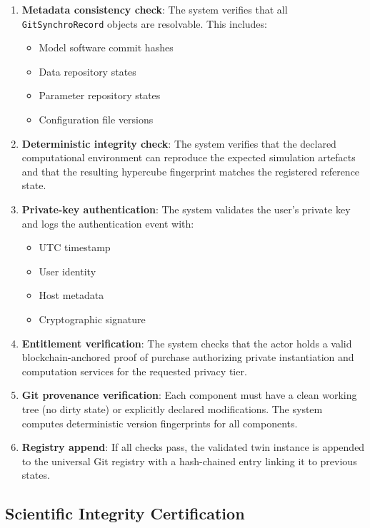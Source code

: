 \begin{enumerate}
\item \textbf{Metadata consistency check}: The system verifies that all \texttt{GitSynchroRecord} objects are resolvable. This includes:
\begin{itemize}
    \item Model software commit hashes
    \item Data repository states
    \item Parameter repository states
    \item Configuration file versions
\end{itemize}

\item \textbf{Deterministic integrity check}: The system verifies that the declared computational environment can reproduce the expected simulation artefacts and that the resulting hypercube fingerprint matches the registered reference state.

\item \textbf{Private-key authentication}: The system validates the user's private key and logs the authentication event with:
\begin{itemize}
    \item UTC timestamp
    \item User identity
    \item Host metadata
    \item Cryptographic signature
\end{itemize}

\item \textbf{Entitlement verification}: The system checks that the actor holds a valid blockchain-anchored proof of purchase authorizing private instantiation and computation services for the requested privacy tier.

\item \textbf{Git provenance verification}: Each component must have a clean working tree (no dirty state) or explicitly declared modifications. The system computes deterministic version fingerprints for all components.

\item \textbf{Registry append}: If all checks pass, the validated twin instance is appended to the universal Git registry with a hash-chained entry linking it to previous states.
\end{enumerate}

\subsection{Scientific Integrity Certification}

